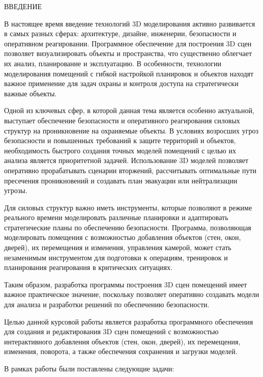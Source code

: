 \begin{center}
    \MakeUppercase{\large Введение}
\end{center}

В настоящее время введение технологий 3D моделирования активно развивается в самых разных сферах: архитектуре, дизайне, инженерии, безопасности и оперативном реагировании. Программное обеспечение для построения 3D сцен позволяет визуализировать объекты и пространства, что существенно облегчает их анализ, планирование и эксплуатацию. В особенности, технологии моделирования помещений с гибкой настройкой планировок и объектов находят важное применение для задач охраны и контроля доступа на стратегически важные объекты.~\cite{iter}

Одной из ключевых сфер, в которой данная тема является особенно актуальной, выступает обеспечение безопасности и оперативного реагирования силовых структур на проникновение на охраняемые объекты. В условиях возросших угроз безопасности и повышенных требований к защите территорий и объектов, необходимость быстрого создания точных моделей помещений с целью их анализа является приоритетной задачей. Использование 3D моделей позволяет оперативно прорабатывать сценарии вторжений, рассчитывать оптимальные пути пресечения проникновений и создавать план эвакуации или нейтрализации угрозы.

Для силовых структур важно иметь инструменты, которые позволяют в режиме реального времени моделировать различные планировки и адаптировать стратегические планы по обеспечению безопасности. Программа, позволяющая моделировать помещения с возможностью добавления объектов (стен, окон, дверей), их перемещения и изменения, управления камерой, может стать незаменимым инструментом для подготовки к операциям, тренировок и планирования реагирования в критических ситуациях.

Таким образом, разработка программы построения 3D сцен помещений имеет важное практическое значение, поскольку позволяет оперативно создавать модели для анализа и разработки решений по обеспечению безопасности.

Целью данной курсовой работы является разработка программного обеспечения для создания и редактирования 3D сцен помещений с возможностью интерактивного добавления объектов (стен, окон, дверей), их перемещения, изменения, поворота, а также обеспечения сохранения и загрузки моделей.

\vspace{0.25cm}
В рамках работы были поставлены следующие задачи:

